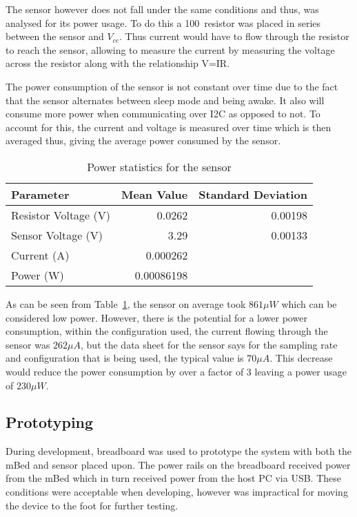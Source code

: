 The sensor however does not fall under the same conditions and thus, was analysed for its power usage. To do this a 100\ohm ~resistor was placed in series between the sensor and $V_{cc}$. Thus current would have to flow through the resistor to reach the sensor, allowing to measure the current by measuring the voltage across the resistor along with the relationship V=IR.

The power consumption of the sensor is not constant over time due to the fact that the sensor alternates between sleep mode and being awake. It also will consume more power when communicating over I2C as opposed to not. To account for this, the current and voltage is measured over time which is then averaged thus, giving the average power consumed by the sensor.

\begin{table}
	\centering
	\begin{tabular}{|l|r|r|}
		\hline
		Parameter & Mean Value & Standard Deviation \\
		\hline
		Resistor Voltage (V) & 0.0262 & 0.00198 \\
		Sensor Voltage (V) & 3.29 & 0.00133 \\
		Current (A) & 0.000262 & \\
		Power (W) & 0.00086198 & \\
		\hline
	\end{tabular}
	\caption{Power statistics for the sensor}
	\label{tab:power}
\end{table}

As can be seen from Table~\ref{tab:power}, the sensor on average took $861\mu W$ which can be considered low power. However, there is the potential for a lower power consumption, within the configuration used, the current flowing through the sensor was $262\mu A$, but the data sheet for the sensor says for the sampling rate and configuration that is being used, the typical value is $70\mu A$. This decrease would reduce the power consumption by over a factor of 3 leaving a power usage of $230\mu W$.

\subsection{Prototyping}

During development, breadboard was used to prototype the system with both the mBed and sensor placed upon. The power rails on the breadboard received power from the mBed which in turn received power from the host PC via USB. These conditions were acceptable when developing, however was impractical for moving the device to the foot for further testing. 

